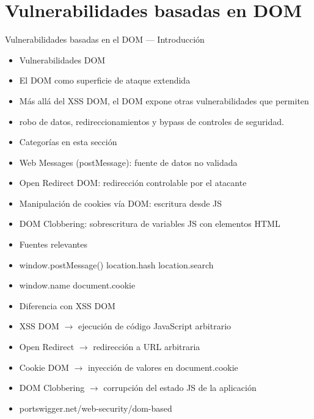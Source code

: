 \documentclass[aspectratio=169,10pt]{beamer}
\begin{document}
\section{Vulnerabilidades basadas en DOM}

\begin{frame}[allowframebreaks]{Vulnerabilidades basadas en el DOM --- Introducción}
\small
  \begin{itemize}
  \item Vulnerabilidades DOM
  \item El DOM como superficie de ataque extendida
  \item Más allá del XSS DOM, el DOM expone otras vulnerabilidades que permiten
  \item robo de datos, redireccionamientos y bypass de controles de seguridad.
  \item Categorías en esta sección
  \item Web Messages (postMessage): fuente de datos no validada
  \item Open Redirect DOM: redirección controlable por el atacante
  \item Manipulación de cookies vía DOM: escritura desde JS
  \item DOM Clobbering: sobrescritura de variables JS con elementos HTML
  \item Fuentes relevantes
  \item window.postMessage() location.hash location.search
  \item window.name document.cookie
  \item Diferencia con XSS DOM
  \item XSS DOM $\rightarrow$ ejecución de código JavaScript arbitrario
  \item Open Redirect $\rightarrow$ redirección a URL arbitraria
  \item Cookie DOM $\rightarrow$ inyección de valores en document.cookie
  \item DOM Clobbering $\rightarrow$ corrupción del estado JS de la aplicación
  \item portswigger.net/web-security/dom-based
  \end{itemize}
\end{frame}
\end{document}
